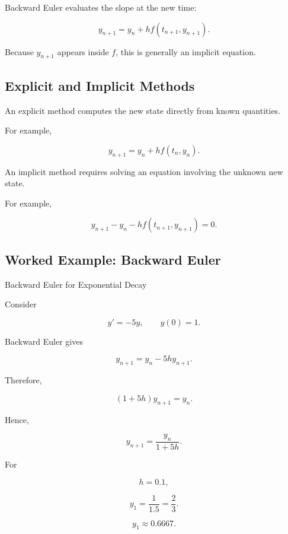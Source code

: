 Backward Euler evaluates the slope at the new time:

\[
\boxed{
y_{n+1}
=
y_n
+
h
f(t_{n+1},y_{n+1}).
}
\]

Because \(y_{n+1}\) appears inside \(f\), this is generally an implicit
equation.

\subsection{Explicit and Implicit Methods}
\label{subsec:explicit-implicit-ode-methods}

An explicit method computes the new state directly from known quantities.

For example,

\[
\boxed{
y_{n+1}
=
y_n
+
hf(t_n,y_n).
}
\]

An implicit method requires solving an equation involving the unknown new
state.

For example,

\[
\boxed{
y_{n+1}
-
y_n
-
hf(t_{n+1},y_{n+1})
=
0.
}
\]

\subsection{Worked Example: Backward Euler}
\label{subsec:worked-backward-euler}

\begin{workedexamplebox}{Backward Euler for Exponential Decay}

Consider

\[
y'=-5y,
\qquad
y(0)=1.
\]

Backward Euler gives

\[
y_{n+1}
=
y_n
-
5hy_{n+1}.
\]

Therefore,

\[
(1+5h)y_{n+1}
=
y_n.
\]

Hence,

\[
\boxed{
y_{n+1}
=
\frac{
y_n
}{
1+5h
}.
}
\]

For

\[
h=0.1,
\]

\[
y_1
=
\frac1{1.5}
=
\frac23.
\]

\begin{answerbox}
\[
\boxed{
y_1
\approx0.6667.
}
\]
\end{answerbox}

\end{workedexamplebox}

